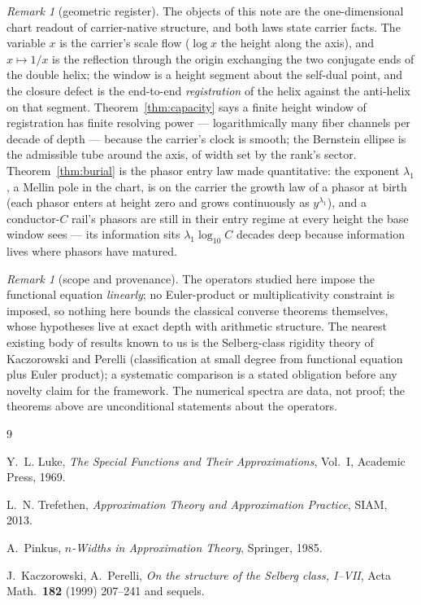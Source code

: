 \documentclass[11pt]{article}
\theoremstyle{definition}
\theoremstyle{remark}
\newtheorem{remark}[theorem]{Remark}
\begin{document}
\begin{remark}[geometric register]
The objects of this note are the one-dimensional chart readout of
carrier-native structure, and both laws state carrier facts.  The variable
$x$ is the carrier's scale flow ($\log x$ the height along the axis), and
$x\mapsto1/x$ is the reflection through the origin exchanging the two
conjugate ends of the double helix; the window is a height segment about the
self-dual point, and the closure defect is the end-to-end \emph{registration}
of the helix against the anti-helix on that segment.
Theorem~\ref{thm:capacity} says a finite height window of registration has
finite resolving power --- logarithmically many fiber channels per decade of
depth --- because the carrier's clock is smooth; the Bernstein ellipse is the
admissible tube around the axis, of width set by the rank's sector.
Theorem~\ref{thm:burial} is the phasor entry law made quantitative: the
exponent $\lambda_1$, a Mellin pole in the chart, is on the carrier the
growth law of a phasor at birth (each phasor enters at height zero and grows
continuously as $y^{\lambda_1}$), and a conductor-$C$ rail's phasors are
still in their entry regime at every height the base window sees --- its
information sits $\lambda_1\log_{10}C$ decades deep because information
lives where phasors have matured.
\end{remark}

\begin{remark}[scope and provenance]
The operators studied here impose the functional equation \emph{linearly};
no Euler-product or multiplicativity constraint is imposed, so nothing here
bounds the classical converse theorems themselves, whose hypotheses live at
exact depth with arithmetic structure.  The nearest existing body of
results known to us is the Selberg-class rigidity theory of Kaczorowski and
Perelli (classification at small degree from functional equation plus Euler
product); a systematic comparison is a stated obligation before any novelty
claim for the framework.  The numerical spectra are data, not proof; the
theorems above are unconditional statements about the operators.
\end{remark}

\begin{thebibliography}{9}

 Y.~L. Luke, \emph{The Special Functions and Their
Approximations}, Vol.~I, Academic Press, 1969.

 L.~N. Trefethen, \emph{Approximation Theory and
Approximation Practice}, SIAM, 2013.

 A.~Pinkus, \emph{$n$-Widths in Approximation Theory},
Springer, 1985.

 J.~Kaczorowski, A.~Perelli, \emph{On the structure of the
Selberg class, I--VII}, Acta Math.\ \textbf{182} (1999) 207--241 and
sequels.

\end{thebibliography}
\end{document}
